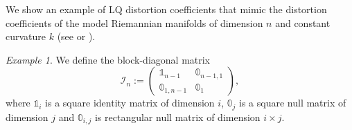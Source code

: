 \documentclass[reqno]{amsart}
\theoremstyle{plain}
\theoremstyle{definition}
\theoremstyle{remark}
\newtheorem{exmp}[thm]{Example}
\begin{document}
        We show an example of LQ distortion coefficients that mimic the distortion coefficients of the model Riemannian manifolds of dimension $n$ and constant curvature $k$ (see \cite{SturmGeomMmsI,SturmGeomMmsII,lott2006riccicurvmmspaces} or \cite[Chapter 14]{Villanioldandnew}).
		\begin{exmp}\label{reproducing_CD_kn_Riem}
				We define the block-diagonal matrix
			\begin{equation}
				\mathcal{I}_n:=\begin{pmatrix}
					\mathbb{1}_{n-1} & \mathbb{0}_{n-1,1}\\
					\mathbb{0}_{1,n-1} & \mathbb{0}_1
				\end{pmatrix},
			\end{equation}
			where $\mathbb{1}_i$ is a square identity matrix of dimension $i$, $\mathbb{0}_j$ is a square null matrix of dimension $j$ and $\mathbb{0}_{i,j}$ is rectangular null matrix of dimension $i\times j$.
			

\end{exmp}
\end{document}
